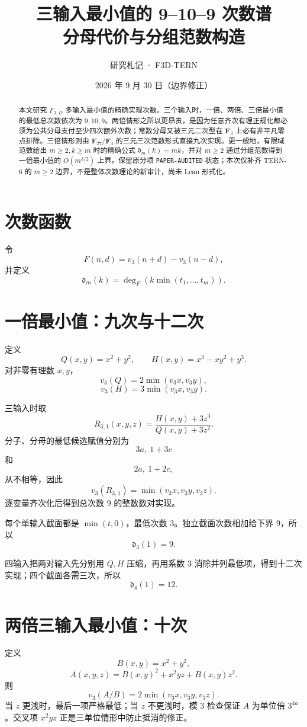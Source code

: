 \documentclass[11pt,a4paper]{ctexart}
\title{\bfseries 三输入最小值的 9--10--9 次数谱\\分母代价与分组范数构造}
\author{研究札记 · F3D-TERN}
\date{2026 年 9 月 30 日（边界修正）}
\begin{document}
\maketitle
\begin{abstract}
本文研究 \(F_{3,D}\) 多输入最小值的精确实现次数。三个输入时，一倍、两倍、三倍最小值的最低总次数依次为 \(9,10,9\)。两倍情形之所以更昂贵，是因为任意齐次有理正规化都必须为公共分母支付至少四次额外次数；常数分母又被三元二次型在 \(\mathbf F_3\) 上必有非平凡零点排除。三倍情形则由 \(\mathbf F_{27}/\mathbf F_3\) 的三元三次范数形式直接九次实现。更一般地，有限域范数给出 \(m\ge2,k\ge m\) 时的精确公式 \(\mathfrak d_m(k)=mk\)，并对 \(m\ge2\) 通过分组范数得到一倍最小值的 \(O(m^{3/2})\) 上界。保留原分项 \texttt{PAPER-AUDITED} 状态；本次仅补齐 TERN-6 的 \(m\ge2\) 边界，不是整体次数理论的新审计，尚未 Lean 形式化。
\end{abstract}

\section{次数函数}
令
\[
F(n,d)=v_3(n+d)-v_3(n-d),
\]
并定义
\[
\mathfrak d_m(k)
=
\deg_F(k\min(t_1,\ldots,t_m)).
\]

\section{一倍最小值：九次与十二次}
定义
\[
Q(x,y)=x^2+y^2,
\qquad
H(x,y)=x^3-xy^2+y^3.
\]
对非零有理数 \(x,y\)，
\[
v_3(Q)=2\min(v_3x,v_3y),
\]
\[
v_3(H)=3\min(v_3x,v_3y).
\]

三输入时取
\[
R_{3,1}(x,y,z)
=
\frac{H(x,y)+3z^3}{Q(x,y)+3z^2}.
\]
分子、分母的最低候选赋值分别为
\[
3a,\ 1+3c
\]
和
\[
2a,\ 1+2c,
\]
从不相等，因此
\[
v_3(R_{3,1})=\min(v_3x,v_3y,v_3z).
\]
逐变量齐次化后得到总次数 \(9\) 的整数数对实现。

每个单输入截面都是 \(\min(t,0)\)，最低次数 \(3\)。独立截面次数相加给下界 \(9\)，所以
\[
\boxed{\mathfrak d_3(1)=9.}
\]

四输入把两对输入先分别用 \(Q,H\) 压缩，再用系数 \(3\) 消除并列最低项，得到十二次实现；四个截面各需三次，所以
\[
\boxed{\mathfrak d_4(1)=12.}
\]

\section{两倍三输入最小值：十次}
定义
\[
B(x,y)=x^2+y^2,
\]
\[
A(x,y,z)
=
B(x,y)^2+x^2yz+B(x,y)z^2.
\]
则
\[
\boxed{
v_3(A/B)
=
2\min(v_3x,v_3y,v_3z).
}
\]
当 \(z\) 更浅时，最后一项严格最低；当 \(z\) 不更浅时，模 \(3\) 检查保证 \(A\) 为单位倍 \(3^{4a}\)。交叉项 \(x^2yz\) 正是三单位情形中防止抵消的修正。
\end{document}
